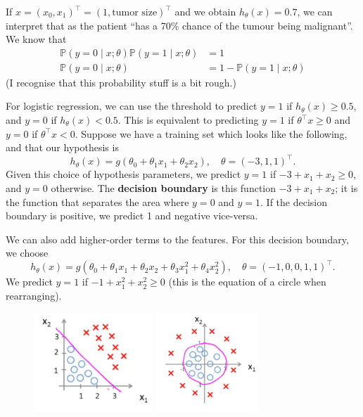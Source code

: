 \documentclass[a4paper, 12pt, oneside]{scrartcl}
\begin{document}
\begin{exmp}
	If $x = (x_0, x_1)^\top = (1, \text{tumor size})^\top$ and we obtain $h_\theta(x) = 0.7$, we can interpret that as the patient ``has a 70\% chance of the tumour being malignant''. We know that
	\begin{align*}
		\mathbb P(y = 0 \mid x; \theta) \mathbb P(y = 1 \mid x; \theta) &= 1 \\
		\mathbb P(y = 0 \mid x; \theta) &= 1 - \mathbb P(y = 1 \mid x; \theta)
	\end{align*}
	(I recognise that this probability stuff is a bit rough.)
\end{exmp}

For logistic regression, we can use the threshold to predict $y=1$ if $h_\theta(x) \geq 0.5$, and $y=0$ if $h_\theta(x) < 0.5$. This is equivalent to predicting $y=1$ if $\theta^\top x \geq 0$ and $y=0$ if $\theta^\top x < 0$. Suppose we have a training set which looks like the following, and that our hypothesis is
\[h_\theta(x) = g(\theta_0 + \theta_1 x_1 + \theta_2 x_2), \quad \theta = (-3, 1, 1)^\top.\]
Given this choice of hypothesis parameters, we predict $y=1$ if $-3 + x_1 + x_2 \geq 0$, and $y=0$ otherwise. The \textbf{decision boundary} is this function $-3 + x_1 + x_2$; it is the function that separates the area where $y=0$ and $y=1$. If the decision boundary is positive, we predict 1 and negative vice-versa.

We can also add higher-order terms to the features. For this decision boundary, we choose
\[h_\theta(x) = g(\theta_0 + \theta_1 x_1 + \theta_2 x_2 + \theta_3 x_1^2 + \theta_4 x^2_2), \quad \theta = (-1, 0, 0, 1, 1)^\top.\]
We predict $y=1$ if $-1 + x_1^2 + x_2^2 \geq 0$ (this is the equation of a circle when rearranging).

\begin{figure}[H]
	\centering
	\includegraphics[height=10em]{figures/db1}
	\includegraphics[height=10em]{figures/db2}
\end{figure}
\end{document}
